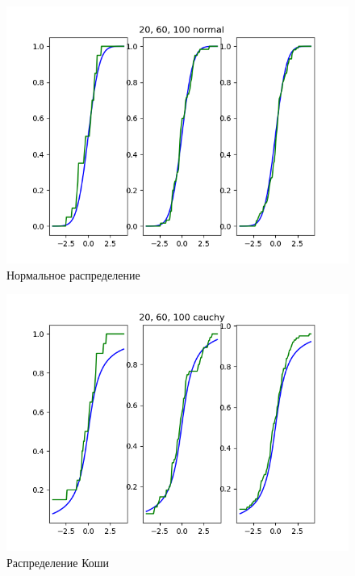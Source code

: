 \documentclass[a4]{article}
\begin{document}
\begin{center}
			\begin{figure}[h!]
				\includegraphics[width=\textwidth]{normalemp.png} 
				\caption[Нормальное распределение]{Нормальное распределение}
			\end{figure}
			\newpage
			\begin{figure}[h!]
				\includegraphics[width=\textwidth]{cauchyemp.png}
				\caption[Распределение Коши]{Распределение Коши}
			\end{figure}
			\newpage
			\begin{figure}[h!]

\end{figure}
\end{center}
\end{document}
